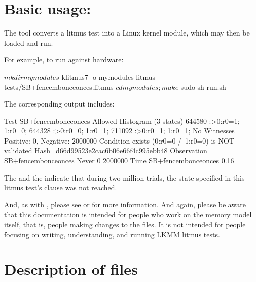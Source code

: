 \section{Basic usage: }

The  tool converts a litmus test into a Linux kernel module,
which may then be loaded and run.

For example, to run  against hardware:

\begin{VerbatimU}
  $ mkdir mymodules
  $ klitmus7 -o mymodules litmus-tests/SB+fencembonceonces.litmus
  $ cd mymodules ; make
  $ sudo sh run.sh
\end{VerbatimU}

The corresponding output includes:

\begin{VerbatimU}
  Test SB+fencembonceonces Allowed
  Histogram (3 states)
  644580  :>0:r0=1; 1:r0=0;
  644328  :>0:r0=0; 1:r0=1;
  711092  :>0:r0=1; 1:r0=1;
  No
  Witnesses
  Positive: 0, Negative: 2000000
  Condition exists (0:r0=0 /\ 1:r0=0) is NOT validated
  Hash=d66d99523e2cac6b06e66f4c995ebb48
  Observation SB+fencembonceonces Never 0 2000000
  Time SB+fencembonceonces 0.16
\end{VerbatimU}

The  and the  indicate
that during two million trials, the state specified in this litmus
test's  clause was not reached.

And, as with , please see  or
 for more information.
And again, please be aware that this documentation is intended for people
who work on the memory model itself, that is, people making changes to
the  files.
It is not intended for people focusing on writing, understanding, and
running LKMM litmus tests.

\section{Description of files}

